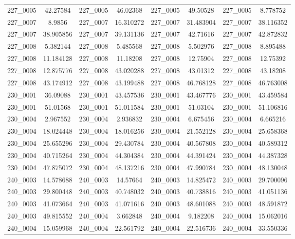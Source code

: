 \begin{table}[H]
\begin{tabular}{|c|c|c|c|c|c|c|c|}
        227\_0005 & 42.27584 & 227\_0005 & 46.02368 & 227\_0005 & 49.50528 & 227\_0005 & 8.778752 \\
        227\_0007 & 8.9856 & 227\_0007 & 16.310272 & 227\_0007 & 31.483904 & 227\_0007 & 38.116352 \\
        227\_0007 & 38.905856 & 227\_0007 & 39.131136 & 227\_0007 & 42.71616 & 227\_0007 & 42.872832 \\
        227\_0008 & 5.382144 & 227\_0008 & 5.485568 & 227\_0008 & 5.502976 & 227\_0008 & 8.895488 \\
        227\_0008 & 11.184128 & 227\_0008 & 11.18208 & 227\_0008 & 12.75904 & 227\_0008 & 12.75392 \\
        227\_0008 & 12.875776 & 227\_0008 & 43.020288 & 227\_0008 & 43.01312 & 227\_0008 & 43.18208 \\
        227\_0008 & 43.174912 & 227\_0008 & 43.199488 & 227\_0008 & 46.768128 & 227\_0008 & 46.763008 \\
        230\_0001 & 36.09088 & 230\_0001 & 43.457536 & 230\_0001 & 43.467776 & 230\_0001 & 43.459584 \\
        230\_0001 & 51.01568 & 230\_0001 & 51.011584 & 230\_0001 & 51.03104 & 230\_0001 & 51.106816 \\
        230\_0004 & 2.967552 & 230\_0004 & 2.936832 & 230\_0004 & 6.675456 & 230\_0004 & 6.665216 \\
        230\_0004 & 18.024448 & 230\_0004 & 18.016256 & 230\_0004 & 21.552128 & 230\_0004 & 25.658368 \\
        230\_0004 & 25.655296 & 230\_0004 & 29.430784 & 230\_0004 & 40.567808 & 230\_0004 & 40.589312 \\
        230\_0004 & 40.715264 & 230\_0004 & 44.304384 & 230\_0004 & 44.391424 & 230\_0004 & 44.387328 \\
        230\_0004 & 47.875072 & 230\_0004 & 48.137216 & 230\_0004 & 47.990784 & 230\_0004 & 48.130048 \\
        240\_0003 & 14.578688 & 240\_0003 & 14.57664 & 240\_0003 & 14.825472 & 240\_0003 & 29.700096 \\
        240\_0003 & 29.800448 & 240\_0003 & 40.748032 & 240\_0003 & 40.738816 & 240\_0003 & 41.051136 \\
        240\_0003 & 41.073664 & 240\_0003 & 41.071616 & 240\_0003 & 48.601088 & 240\_0003 & 48.591872 \\
        240\_0003 & 49.815552 & 240\_0004 & 3.662848 & 240\_0004 & 9.182208 & 240\_0004 & 15.062016 \\
        240\_0004 & 15.059968 & 240\_0004 & 22.561792 & 240\_0004 & 22.516736 & 240\_0004 & 33.550336 \\

\end{tabular}
\end{table}
